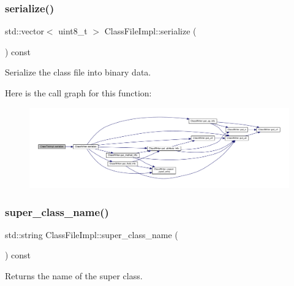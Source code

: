 \mbox{\label{classClassFileImpl_a4e2a4657d4b102369ba7305251d41d00}} 
\subsubsection{\texorpdfstring{serialize()}{serialize()}}
{\footnotesize\ttfamily std\+::vector$<$ uint8\+\_\+t $>$ Class\+File\+Impl\+::serialize (\begin{DoxyParamCaption}{ }\end{DoxyParamCaption}) const}



Serialize the class file into binary data. 

Here is the call graph for this function\+:\nopagebreak
\begin{figure}[H]
\begin{center}
\leavevmode
\includegraphics[width=350pt]{classClassFileImpl_a4e2a4657d4b102369ba7305251d41d00_cgraph}
\end{center}
\end{figure}
\mbox{\label{classClassFileImpl_afd7229efcf341804086bcf6c00bb4820}} 
\subsubsection{\texorpdfstring{super\+\_\+class\+\_\+name()}{super\_class\_name()}}
{\footnotesize\ttfamily std\+::string Class\+File\+Impl\+::super\+\_\+class\+\_\+name (\begin{DoxyParamCaption}{ }\end{DoxyParamCaption}) const}



Returns the name of the super class. 

